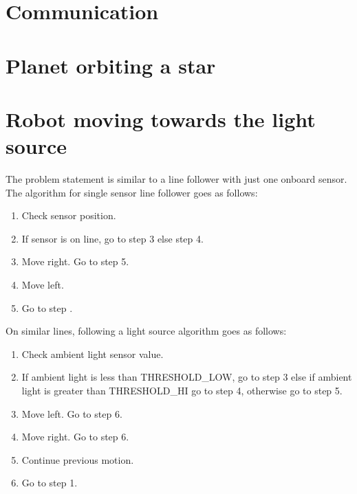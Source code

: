 \documentclass{article}
\begin{document}
\section{Communication}

\section{Planet orbiting a star}

\section{Robot moving towards the light source}
The problem statement is similar to a line follower with just one onboard sensor. The algorithm for single sensor line follower goes as follows:
\begin{enumerate}
    \item Check sensor position.
    \item If sensor is on line, go to step 3 else step 4.
    \item Move right. Go to step 5.
    \item Move left.
    \item Go to step .
\end{enumerate}
On similar lines, following a light source algorithm goes as follows:
\begin{enumerate}
    \item Check ambient light sensor value.
    \item If ambient light is less than THRESHOLD\_LOW, go to step 3 else if ambient light is greater than THRESHOLD\_HI go to step 4, otherwise go to step 5.
    \item Move left. Go to step 6.
    \item Move right. Go to step 6.
    \item Continue previous motion.
    \item Go to step 1.
\end{enumerate}
\end{document}
